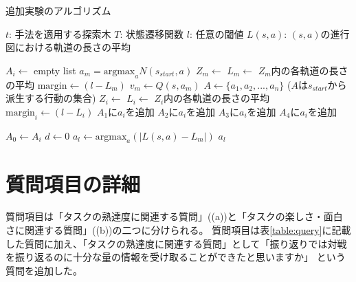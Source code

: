 \begin{algorithm}
    \small
    \caption{追加実験のアルゴリズム}
    \label{alg:myalg-add}
    \begin{algorithmic}[1]
        \State $t$: 手法を適用する探索木
        \State $T$: 状態遷移関数
        \State $l$: 任意の閾値
        \State $L(s, a)$: $(s, a)$の進行図における軌道の長さの平均

        
        
       
               $A_i \gets $ empty list
           \EndFor
           \State $a_m = \textrm{argmax}_a N(s_{start}, a)$
           \State $Z_m \gets$ 
           \State $L_m \gets $ $Z_m$内の各軌道の長さの平均
           \State $\textrm{margin} \gets (l-L_m)$
           \State $v_m \gets Q(s, a_m)$
           \State $A \gets \{a_1, a_2, ..., a_n\}$ ($A$は$s_{start}$から派生する行動の集合)
            \State $Z_i \gets$ 
            \State $L_i \gets $ $Z_i$内の各軌道の長さの平均
            \State $\textrm{margin}_i \gets (l-L_i)$
                    \State $A_1$に$a_i$を追加
                \Else
                    \State $A_2$に$a_i$を追加
                \EndIf
            \Else
                    \State $A_3$に$a_i$を追加
                \Else
                    \State $A_4$に$a_i$を追加
                \EndIf

            \EndIf
           \EndFor

                   $A_0 \gets A_i$
                \EndIf
           \EndFor
           \State $d \gets 0$
           \State $a_l \gets \textrm{argmax}_a (|L(s,a)-L_m|)$
           \State \Return $a_l$
        \EndFunction
    \end{algorithmic}
\end{algorithm}












\section{質問項目の詳細}
質問項目は「タスクの熟達度に関連する質問」((a))と「タスクの楽しさ・面白さに関連する質問」((b))の二つに分けられる。
質問項目は表\ref{table:query}に記載した質問に加え、「タスクの熟達度に関連する質問」として「振り返りでは対戦を振り返るのに十分な量の情報を受け取ることができたと思いますか」
という質問を追加した。
